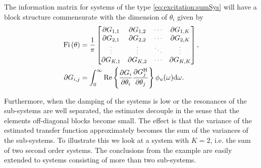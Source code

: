 The information matrix for systems of the type \eqref{eq:excitation:sumSys} will have a block structure commensurate with the dimension of $\theta_i$ given by
\begin{align}
\Fi{\theta} &= \frac{1}{\pi}
\begin{bmatrix}
  \partial G_{1,1}        &\partial G_{1,2}       &\deemph{\cdots}         &\partial G_{1,K}\\
  \partial G_{2,1}        &\partial G_{2,2}       &\deemph{\cdots}         &\partial G_{2,K}\\
  \deemph{\vdots}                  &\deemph{\vdots}                 &\deemph{\ddots}         &\deemph{\vdots}          \\
  \partial G_{K,1}        &\partial G_{K,2}       &\deemph{\cdots}         &\partial G_{K,K}
\end{bmatrix},\\
\partial G_{i,j} &= \int_0^\infty
                      \RealPart\left\{
                          \frac{\partial G_i}
                               {\partial \theta_i}
                          \frac{\partial G_j^{\HT}}
                               {\partial \theta_j}
                                \right\}
                      \phi_u(\omega)\dd\omega.
\end{align}

Furthermore, when the damping of the systems is low or the resonances of the sub-systems are well separated, the estimates decouple in the sense that the elements off-diagonal blocks become small.
The effect is that the variance of the estimated transfer function approximately becomes the sum of the variances of the sub-systems.
To illustrate this we look at a system with $K=2$, i.e. the sum of two second order systems.
The conclusions from the example are easily extended to systems consisting of more than two sub-systems.


